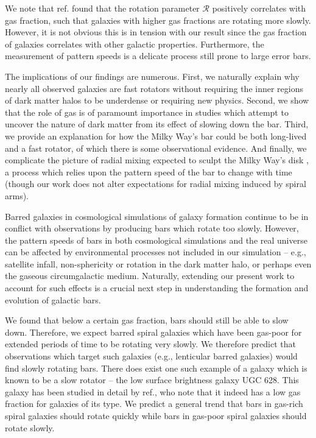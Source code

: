 \documentclass{natureprintstyle}
\newcommand{\Rot}{\ensuremath{\mathcal{R}}}
\begin{document}
We note that ref.\cite{2020MNRAS.491.3655G} found that the rotation parameter
\Rot{} positively correlates with gas fraction, such that galaxies with higher
gas fractions are rotating more slowly. However, it is not obvious this is in
tension with our result since the gas fraction of galaxies correlates with
other galactic properties.\cite{2009ARAA..47..159B} Furthermore, the
measurement of pattern speeds is a delicate process still prone to large error
bars.

The implications of our findings are numerous. First, we naturally explain why
nearly all observed galaxies are fast rotators without requiring the inner
regions of dark matter halos to be underdense\cite{1998ApJ...493L...5D,
2000ApJ...543..704D} or requiring new physics.\cite{2021MNRAS.503.2833R,
2021MNRAS.508..926R} Second, we show that the role of gas is of paramount
importance in studies which attempt to uncover the nature of dark matter from
its effect of slowing down the bar.\cite{2021MNRAS.500.4710C,
2021MNRAS.505.2412C} Third, we provide an explanation for how the Milky Way's
bar could be both long-lived and a fast rotator, of which there is some
observational evidence.\cite{2019MNRAS.490.4740B} And finally, we complicate
the picture of radial mixing expected to sculpt the Milky Way's disk
\cite{2012MNRAS.420..913B, 2015ApJ...808..132H}, a process which relies upon
the pattern speed of the bar to change with time (though our work does not
alter expectations for radial mixing induced by spiral
arms\cite{2002MNRAS.336..785S}).

Barred galaxies in cosmological simulations of galaxy formation continue to be
in conflict with observations by producing bars which rotate too
slowly.\cite{2017MNRAS.469.1054A, 2019MNRAS.483.2721P, 2021AA...650L..16F}
However, the pattern speeds of bars in both cosmological simulations and the
real universe can be affected by environmental processes not included in our
simulation -- e.g., satellite infall\cite{2011Natur.477..301P},
non-sphericity\cite{2013MNRAS.429.1949A} or rotation\cite{2013MNRAS.434.1287S,
2014ApJ...783L..18L, 2018MNRAS.476.1331C, 2019MNRAS.488.5788C} in the dark
matter halo, or perhaps even the gaseous circumgalactic medium. Naturally,
extending our present work to account for such effects is a crucial next step
in understanding the formation and evolution of galactic bars.

We found that below a certain gas fraction, bars should still be able to slow
down. Therefore, we expect barred spiral galaxies which have been gas-poor for
extended periods of time to be rotating very slowly. We therefore predict that
observations which target such galaxies (e.g., lenticular barred
galaxies\cite{2009ARAA..47..159B}) would find slowly rotating bars. There does
exist one such example of a galaxy which is known to be a slow rotator -- the
low surface brightness galaxy UGC 628.\cite{2009AA...499L..25C} This galaxy
has been studied in detail by ref.\cite{2016MNRAS.463.1751C}, who note that it
indeed has a low gas fraction for galaxies of its type. We predict a general
trend that bars in gas-rich spiral galaxies should rotate quickly while bars
in gas-poor spiral galaxies should rotate slowly.
\end{document}
